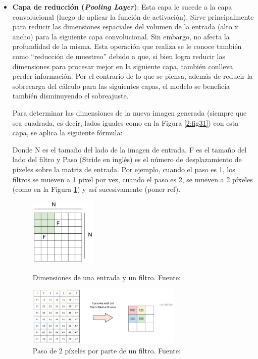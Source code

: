 \begin{itemize}
\begin{itemize}
\begin{itemize}
			\item \textbf{Capa de reducción (\textit{Pooling Layer})}: Esta capa le sucede a la capa convolucional (luego de aplicar la función de activación). Sirve principalmente para reducir las dimensiones espaciales del volumen de la entrada (alto x ancho) para la siguiente capa convolucional. Sin embargo, no afecta la profundidad de la misma. Esta operación que realiza se le conoce también como “reducción de muestreo” debido a que, si bien logra reducir las dimensiones para procesar mejor en la siguiente capa, también conlleva perder información. Por el contrario de lo que se piensa, además de reducir la sobrecarga del cálculo para las siguientes capas, el modelo se beneficia también disminuyendo el sobreajuste.
			
			Para determinar las dimensiones de la nueva imagen generada (siempre que sea cuadrada, es decir, lados iguales como en la Figura \ref{2:fig31}) con esta capa, se aplica la siguiente fórmula:
			
			Donde N es el tamaño del lado de la imagen de entrada, F es el tamaño del lado del filtro y Paso (Stride en inglés) es el número de desplazamiento de píxeles sobre la matriz de entrada. Por ejemplo, cuando el paso es 1, los filtros se mueven a 1 pixel por vez, cuando el paso es 2, se mueven a 2 píxeles (como en la Figura \ref{2:fig32}) y así sucesivamente (poner ref).
			\begin{figure}[htbp]
				\begin{center}
					\includegraphics[width=0.3\textwidth]{2/figures/input_filter_cnn.jpg}
					\caption{Dimensiones de una entrada y un filtro. Fuente: \cite{tec_li2019cnn}}
					\label{2:fig31}
					
					\includegraphics[width=0.7\textwidth]{2/figures/stride_cnn.jpg}
					\caption{Paso de 2 píxeles por parte de un filtro. Fuente: \cite{tec_prabhu2018cnn}}
					\label{2:fig32}
				\end{center}
			\end{figure}
			

\end{itemize}
\end{itemize}
\end{itemize}
